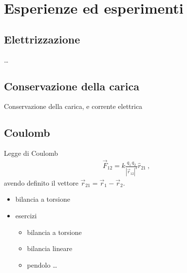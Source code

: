 \documentclass[letterpaper,10pt,italian]{jupyterBook}
\begin{document}
\sphinxstepscope


\section{Esperienze ed esperimenti}
\label{\detokenize{ch/electromagnetism/intro-experiments:esperienze-ed-esperimenti}}\label{\detokenize{ch/electromagnetism/intro-experiments:physics-hs-electromagnetism-intro-experiments}}\label{\detokenize{ch/electromagnetism/intro-experiments::doc}}

\subsection{Elettrizzazione}
\label{\detokenize{ch/electromagnetism/intro-experiments:elettrizzazione}}
\sphinxAtStartPar
…


\subsection{Conservazione della carica}
\label{\detokenize{ch/electromagnetism/intro-experiments:conservazione-della-carica}}
\sphinxAtStartPar
Conservazione della carica, e corrente elettrica


\subsection{Coulomb}
\label{\detokenize{ch/electromagnetism/intro-experiments:coulomb}}
\sphinxAtStartPar
Legge di Coulomb
\begin{equation*}
\begin{split}\vec{F}_{12} = k \frac{q_1 \, q_2}{|\vec{r}_{12}|^2} \hat{r}_{21} \ ,\end{split}
\end{equation*}
\sphinxAtStartPar
avendo definito il vettore \(\vec{r}_{21} = \vec{r}_1 - \vec{r}_2\).
\begin{itemize}
\item {} 
\sphinxAtStartPar
bilancia a torsione

\item {} 
\sphinxAtStartPar
esercizi
\begin{itemize}
\item {} 
\sphinxAtStartPar
bilancia a torsione

\item {} 
\sphinxAtStartPar
bilancia lineare

\item {} 
\sphinxAtStartPar
pendolo
…

\end{itemize}

\end{itemize}
\end{document}

